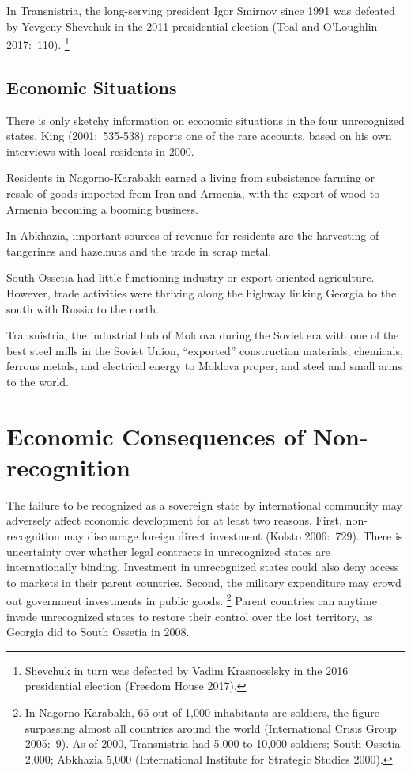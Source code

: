 \documentclass[12pt,a4paper]{article}%
\begin{document}
In Transnistria, the long-serving president Igor Smirnov since 1991 was defeated by Yevgeny Shevchuk in the 2011 presidential election (Toal and O'Loughlin 2017:\ 110).%
\footnote{
	Shevchuk in turn was defeated by Vadim Krasnoselsky in the 2016 presidential election (Freedom House 2017).
	}

\subsection{Economic Situations}\label{economic}
There is only sketchy information on economic situations in the four unrecognized states. King (2001:\ 535-538) reports one of the rare accounts, based on his own interviews with local residents in 2000. 

Residents in Nagorno-Karabakh earned a living from subsistence farming or resale of goods imported from Iran and Armenia, with the export of wood to Armenia becoming a booming business. 

In Abkhazia, important sources of revenue for residents are the harvesting of tangerines and hazelnuts and the trade in scrap metal. 

South Ossetia had little functioning industry or export-oriented agriculture. However, trade activities were thriving along the highway linking Georgia to the south with Russia to the north. 

Transnistria, the industrial hub of Moldova during the Soviet era with one of the best steel mills in the Soviet Union, ``exported'' construction materials, chemicals, ferrous metals, and electrical energy to Moldova proper, and steel and small arms to the world.

\section{Economic Consequences of Non-recognition}\label{theory}
The failure to be recognized as a sovereign state by international community may adversely affect economic development for at least two reasons.
First, non-recognition may discourage foreign direct investment (Kolsto 2006:\ 729). 
There is uncertainty over whether legal contracts in unrecognized states are internationally binding. 
Investment in unrecognized states could also deny access to markets in their parent countries.
Second, the military expenditure may crowd out government investments in public goods.%
\footnote{
	In Nagorno-Karabakh, 65 out of 1,000 inhabitants are soldiers, the figure surpassing almost all countries around the world (International Crisis Group 2005:\ 9). 
	As of 2000, Transnistria had 5,000 to 10,000 soldiers; South Ossetia 2,000; Abkhazia 5,000 (International Institute for Strategic Studies 2000).
}
Parent countries can anytime invade unrecognized states to restore their control over the lost territory, as Georgia did to South Ossetia in 2008.
\end{document}
